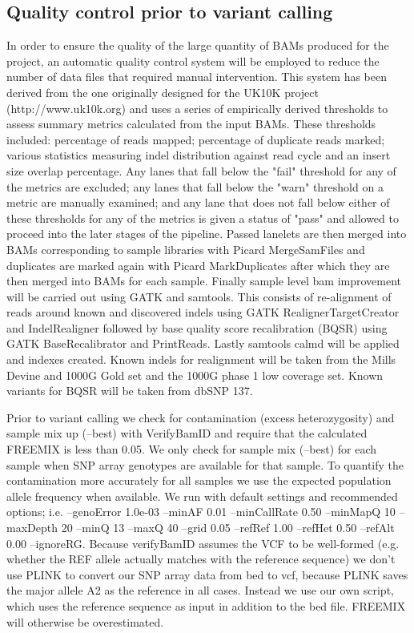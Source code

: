 \subsection{Quality control prior to variant calling}
In order to ensure the quality of the large quantity of BAMs produced for the project, an automatic quality control system will be employed to reduce the number of data files that required manual intervention. This system has been derived from the one originally designed for the UK10K project (http://www.uk10k.org) and uses a series of empirically derived thresholds to assess summary metrics calculated from the input BAMs. These thresholds included: percentage of reads mapped; percentage of duplicate reads marked; various statistics measuring indel distribution against read cycle and an insert size overlap percentage. Any lanes that fall below the "fail" threshold for any of the metrics are excluded; any lanes that fall below the "warn" threshold on a metric are manually examined; and any lane that does not fall below either of these thresholds for any of the metrics is given a status of "pass" and allowed to proceed into the later stages of the pipeline.
Passed lanelets are then merged into BAMs corresponding to sample libraries with Picard MergeSamFiles and duplicates are marked again with Picard MarkDuplicates after which they are then merged into BAMs for each sample.  Finally sample level bam improvement will be carried out using GATK and samtools. This consists of re-alignment of reads around known and discovered indels using GATK RealignerTargetCreator and IndelRealigner followed by base quality score recalibration (BQSR) using GATK BaseRecalibrator and PrintReads. Lastly samtools calmd will be applied and indexes created. Known indels for realignment will be taken from the Mills Devine and 1000G Gold set and the 1000G phase 1 low coverage set. Known variants for BQSR will be taken from dbSNP 137.

Prior to variant calling we check for contamination (excess heterozygosity) and sample mix up (--best) with VerifyBamID and require that the calculated FREEMIX is less than 0.05. We only check for sample mix (--best) for each sample when SNP array genotypes are available for that sample. To quantify the contamination more accurately for all samples we use the expected population allele frequency when available. We run with default settings and recommended options; i.e. --genoError 1.0e-03 --minAF 0.01 --minCallRate 0.50 --minMapQ 10 --maxDepth 20 --minQ 13 --maxQ 40 --grid 0.05 --refRef 1.00 --refHet 0.50 --refAlt 0.00 --ignoreRG. Because verifyBamID assumes the VCF to be well-formed (e.g. whether the REF allele actually matches with the reference sequence) we don't use PLINK to convert our SNP array data from bed to vcf, because PLINK saves the major allele A2 as the reference in all cases. Instead we use our own script, which uses the reference sequence as input in addition to the bed file. FREEMIX will otherwise be overestimated.
